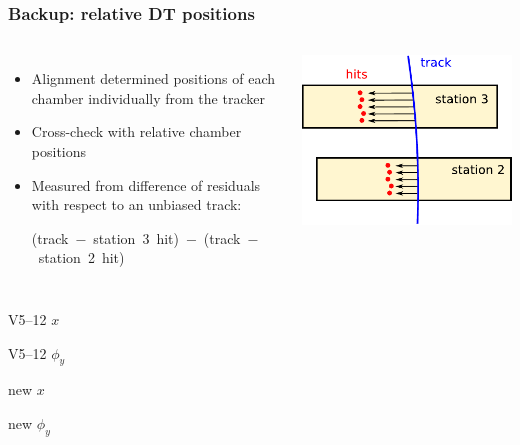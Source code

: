 \documentclass[compress]{beamer}
\begin{document}
\begin{frame}
\frametitle{Backup: relative DT positions}
\begin{columns}
\begin{itemize}
\item Alignment determined positions of each chamber individually from the tracker
\item Cross-check with relative chamber positions
\item Measured from difference of residuals with respect to an unbiased track:

\mbox{(track $-$ station 3 hit) $-$ (track $-$ station 2 hit)}
\end{itemize}
\includegraphics[width=\linewidth]{residuals_difference.pdf}
\end{columns}

\vspace{0.25 cm}
\begin{minipage}{0.24\linewidth}\begin{center} \scriptsize V5--12 $x$ \end{center}\end{minipage}
\begin{minipage}{0.24\linewidth}\begin{center} \scriptsize V5--12 $\phi_y$ \end{center}\end{minipage}
\begin{minipage}{0.24\linewidth}\begin{center} \scriptsize new $x$ \end{center}\end{minipage}
\begin{minipage}{0.24\linewidth}\begin{center} \scriptsize new $\phi_y$ \end{center}\end{minipage}


\end{frame}
\end{document}
